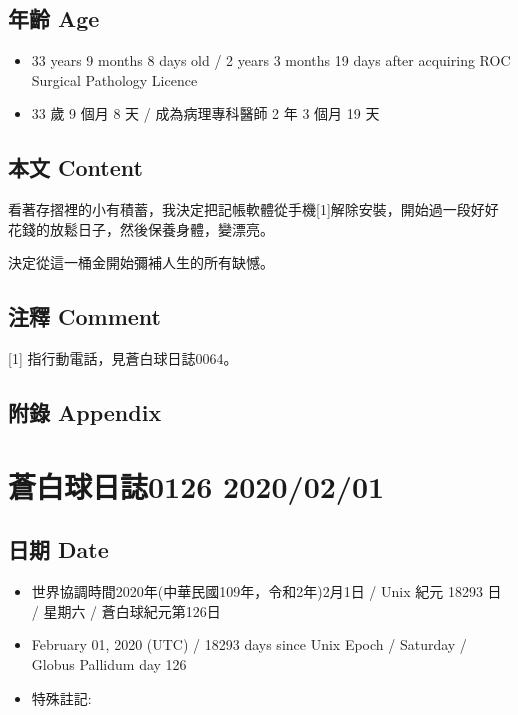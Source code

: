 \documentclass[
]{article}
\providecommand{\tightlist}{%
  \setlength{\itemsep}{0pt}\setlength{\parskip}{0pt}}
\begin{document}
\hypertarget{ux5e74ux9f61-age-61}{%
\subsection{年齡 Age}\label{ux5e74ux9f61-age-61}}

\begin{itemize}
\tightlist
\item
  33 years 9 months 8 days old / 2 years 3 months 19 days after
  acquiring ROC Surgical Pathology Licence
\item
  33 歲 9 個月 8 天 / 成為病理專科醫師 2 年 3 個月 19 天
\end{itemize}

\hypertarget{ux672cux6587-content-61}{%
\subsection{本文 Content}\label{ux672cux6587-content-61}}

看著存摺裡的小有積蓄，我決定把記帳軟體從手機{[}1{]}解除安裝，開始過一段好好花錢的放鬆日子，然後保養身體，變漂亮。

決定從這一桶金開始彌補人生的所有缺憾。

\hypertarget{ux6ce8ux91cb-comment-60}{%
\subsection{注釋 Comment}\label{ux6ce8ux91cb-comment-60}}

{[}1{]} 指行動電話，見蒼白球日誌0064。

\hypertarget{ux9644ux9304-appendix-61}{%
\subsection{附錄 Appendix}\label{ux9644ux9304-appendix-61}}

\hypertarget{ux84bcux767dux7403ux65e5ux8a8c0126-20200201}{%
\section{蒼白球日誌0126
2020/02/01}\label{ux84bcux767dux7403ux65e5ux8a8c0126-20200201}}

\hypertarget{ux65e5ux671f-date-62}{%
\subsection{日期 Date}\label{ux65e5ux671f-date-62}}

\begin{itemize}
\tightlist
\item
  世界協調時間2020年(中華民國109年，令和2年)2月1日 / Unix 紀元 18293 日
  / 星期六 / 蒼白球紀元第126日
\item
  February 01, 2020 (UTC) / 18293 days since Unix Epoch / Saturday /
  Globus Pallidum day 126
\item
  特殊註記:
\end{itemize}
\end{document}

